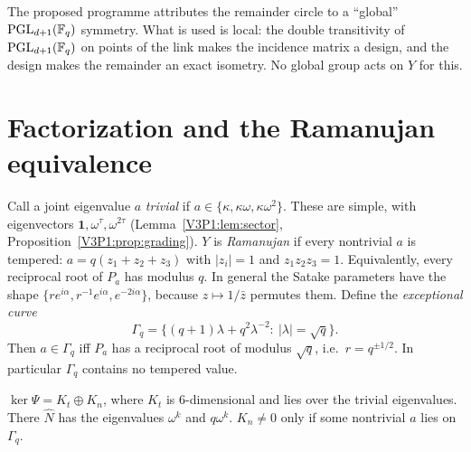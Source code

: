 \begin{remark}\label{V3P4:rem:local}
The proposed programme attributes the remainder circle to a ``global'' $\mathrm{PGL}_{d+1}(\mathbb{F}_q)$ symmetry.
What is used is local: the double transitivity of $\mathrm{PGL}_{d+1}(\mathbb{F}_q)$ on points of the link
makes the incidence matrix a design, and the design makes the remainder an exact isometry.
No global group acts on $Y$ for this.
\end{remark}

\section{Factorization and the Ramanujan equivalence}\label{V3P4:sec:ramanujan}

Call a joint eigenvalue $a$ \emph{trivial} if $a\in\{\kappa,\kappa\omega,\kappa\omega^{2}\}$.
These are simple, with eigenvectors $\mathbf 1,\omega^{\tau},\omega^{2\tau}$
(Lemma~\ref{V3P1:lem:sector}, Proposition~\ref{V3P1:prop:grading}). $Y$ is \emph{Ramanujan}
\cite{LSV05} if every nontrivial $a$ is tempered: $a=q(z_1+z_2+z_3)$ with $|z_i|=1$ and
$z_1z_2z_3=1$. Equivalently, every reciprocal root of $P_a$ has modulus $q$. In general the
Satake parameters have the shape $\{re^{i\alpha},r^{-1}e^{i\alpha},e^{-2i\alpha}\}$, because
$z\mapsto1/\bar z$ permutes them. Define the \emph{exceptional curve}
\[
\Gamma_q=\bigl\{(q+1)\lambda+q^{2}\lambda^{-2}:\ |\lambda|=\sqrt q\bigr\}.
\]
Then $a\in\Gamma_q$ iff $P_a$ has a reciprocal root of modulus $\sqrt q$, i.e.\ $r=q^{\pm1/2}$.
In particular $\Gamma_q$ contains no tempered value.

\begin{lemma}\label{V3P4:lem:kernel}
$\ker\Psi=K_t\oplus K_n$, where $K_t$ is $6$-dimensional and lies over the trivial
eigenvalues. There $\widehat N$ has the eigenvalues $\omega^{k}$ and $q\omega^{k}$. $K_n\neq0$
only if some nontrivial $a$ lies on $\Gamma_q$.
\end{lemma}

